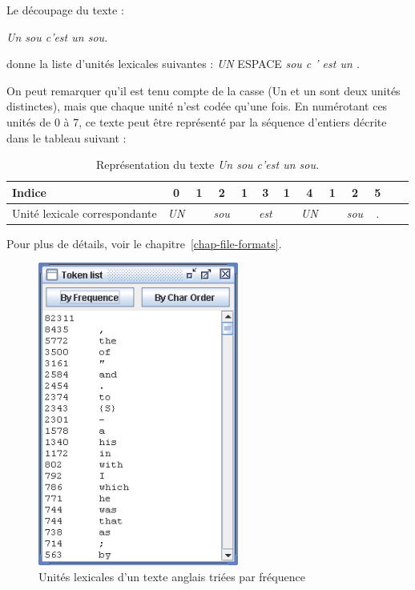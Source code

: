 \bigskip
\noindent Le découpage du texte :

\bigskip
\textit{Un sou c’est un sou.}

\bigskip
\noindent donne la liste d’unités lexicales suivantes :  \textit{UN} ESPACE \textit{sou c ’ est un
.}

\bigskip
\noindent On peut remarquer qu’il est tenu compte de la casse (Un et un sont deux unités distinctes), mais que chaque unité n’est codée qu’une fois. En numérotant ces unités de 0 à 7,
ce texte peut être représenté par la séquence d’entiers décrite dans le tableau suivant :

\bigskip
\begin{table}[h]
\begin{center}
\begin{tabular}{|p{2.8cm}||c|c|c|c|c|c|c|c|c|c|c|c|}
\hline
Indice             & 0 & 1 & 2 & 1 & 3 & 1 & 4 & 1 & 2 & 5
\\
\hline
Unité lexicale correspondante & \textit{UN} &   & \textit{sou} &   & \textit{est} &  & \textit{UN}
& & \textit{sou} & \textit{.}
\\
\hline
\end{tabular}
\caption{Représentation du texte \textit{Un sou c’est un sou.}}
\end{center}
\end{table}

\bigskip
\noindent Pour plus de détails, voir le chapitre~\ref{chap-file-formats}.

\begin{figure}[!h]
\begin{center}
\includegraphics[height=10cm]{resources/img/fig2-12.png}
\caption{Unités lexicales d’un texte anglais triées par fréquence}
\end{center}
\end{figure}



